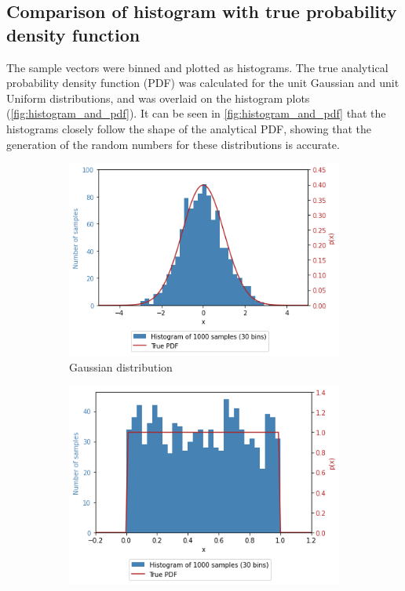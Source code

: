 \documentclass[a4paper]{article}
\begin{document}

\subsection{Comparison of histogram with true probability density function}

The sample vectors were binned and plotted as histograms.
The true analytical probability density function (PDF) was calculated for the unit Gaussian and unit Uniform
distributions, and was overlaid on the histogram plots (\autoref{fig:histogram_and_pdf}).
It can be seen in \autoref{fig:histogram_and_pdf} that the histograms closely follow the shape of the analytical PDF,
showing that the generation of the random numbers for these distributions is accurate.

\begin{figure}[h]
    \centering
    \begin{subfigure}[b]{0.45\textwidth}
        \centering
        \includegraphics[width=\textwidth]{figures/gaussian_histogram_and_pdf.png}
        \caption{Gaussian distribution}
        \label{fig:gaussian_histogram_and_pdf}
    \end{subfigure}
    \hfill
    \begin{subfigure}[b]{0.45\textwidth}
        \centering
        \includegraphics[width=\textwidth]{figures/uniform_histogram_and_pdf.png}

\end{subfigure}
\end{figure}
\end{document}
